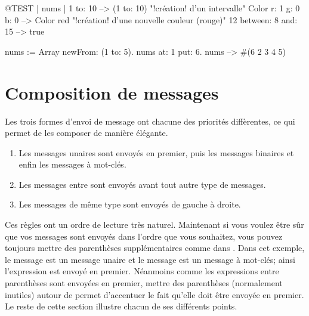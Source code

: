 \documentclass[a4paper,10pt,twoside]{book}
\begin{document}

\begin{code}{@TEST | nums |}
1 to: 10                        --> (1 to: 10)  "!cr\'eation! d'un intervalle"
Color r: 1 g: 0 b: 0       --> Color red  "!cr\'eation! d'une nouvelle
couleur (rouge)"
12 between: 8 and: 15 --> true

nums := Array newFrom: (1 to: 5).
nums at: 1 put: 6.
nums --> #(6 2 3 4 5)
\end{code}


\section{Composition de messages}
Les trois formes d'envoi de message ont chacune des priorit\'es diff\`erentes, ce qui permet de les composer de mani\`ere \'el\'egante.

\begin{enumerate}
\item Les messages unaires sont envoy\'es en premier, puis les messages binaires et enfin les messages \`a mot-cl\'es.
\item Les messages entre  sont envoy\'es avant tout autre type de messages. 
\item Les messages de m\^eme type sont envoy\'es de gauche \`a droite. 
\end{enumerate}

Ces r\`egles ont un ordre de lecture tr\`es naturel. Maintenant si
vous voulez \^etre s\^ur que vos messages sont envoy\'es dans l'ordre
que vous souhaitez, vous pouvez toujours mettre des parenth\`eses
suppl\'ementaires comme dans . Dans cet exemple, le
message  est un message unaire et le message 
est un message \`a mot-cl\'es; ainsi l'expression 
est envoy\'e en premier. N\'eanmoins comme les expressions entre
parenth\`eses sont envoy\'ees en premier, mettre des parenth\`eses
(normalement inutiles) autour de  permet d'accentuer
le fait qu'elle
doit \^etre envoy\'ee en premier. Le reste de cette section illustre
chacun de ses diff\'erents points.
\end{document}

